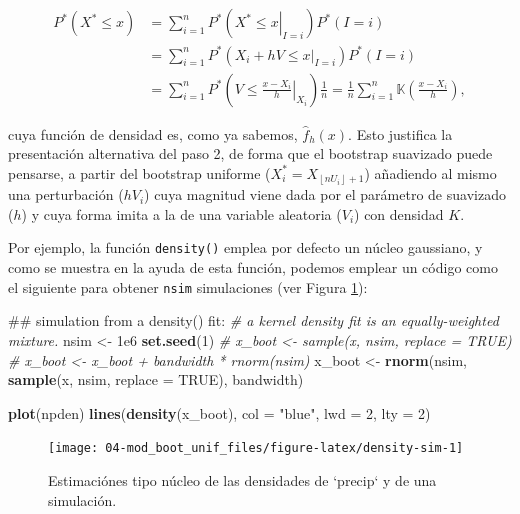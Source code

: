 \documentclass[]{book}
\newenvironment{Shaded}{\begin{snugshade}}{\end{snugshade}}
\newcommand{\KeywordTok}[1]{\textcolor[rgb]{0.13,0.29,0.53}{\textbf{#1}}}
\newcommand{\DataTypeTok}[1]{\textcolor[rgb]{0.13,0.29,0.53}{#1}}
\newcommand{\DecValTok}[1]{\textcolor[rgb]{0.00,0.00,0.81}{#1}}
\newcommand{\FloatTok}[1]{\textcolor[rgb]{0.00,0.00,0.81}{#1}}
\newcommand{\StringTok}[1]{\textcolor[rgb]{0.31,0.60,0.02}{#1}}
\newcommand{\CommentTok}[1]{\textcolor[rgb]{0.56,0.35,0.01}{\textit{#1}}}
\newcommand{\OtherTok}[1]{\textcolor[rgb]{0.56,0.35,0.01}{#1}}
\newcommand{\NormalTok}[1]{#1}
\theoremstyle{definition}
\theoremstyle{definition}
\theoremstyle{definition}
\theoremstyle{remark}
\begin{document}
\[\begin{aligned}
P^{\ast}\left( X^{\ast}\leq x \right) &= \sum_{i=1}^{n}P^{\ast}\left(
\left. X^{\ast}\leq x\right\vert _{I=i} \right) P^{\ast}\left( I=i \right) \\
&= \sum_{i=1}^{n}P^{\ast}\left( \left. X_i+hV\leq x\right\vert
_{I=i} \right) P^{\ast}\left( I=i \right) \\
&= \sum_{i=1}^{n}P^{\ast}\left( \left. V\leq \frac{x-X_i}{h}
\right\vert _{X_i} \right) \frac{1}{n}=\frac{1}{n}\sum_{i=1}^{n}\mathbb{K}
\left( \frac{x-X_i}{h} \right),
\end{aligned}\]

cuya función de densidad es, como ya sabemos,
\(\hat{f}_{h}\left( x \right)\). Esto justifica la presentación
alternativa del paso 2, de forma que el bootstrap suavizado puede
pensarse, a partir del bootstrap uniforme
(\(X_i^{\ast}=X_{\left\lfloor nU_i\right\rfloor +1}\)) añadiendo al
mismo una perturbación (\(hV_i\)) cuya magnitud viene dada por el
parámetro de suavizado (\(h\)) y cuya forma imita a la de una variable
aleatoria (\(V_i\)) con densidad \(K\).

Por ejemplo, la función \texttt{density()} emplea por defecto un núcleo
gaussiano, y como se muestra en la ayuda de esta función, podemos
emplear un código como el siguiente para obtener \texttt{nsim}
simulaciones (ver Figura \ref{fig:density-sim}):

\begin{Shaded}
\begin{Highlighting}[]
\NormalTok{## simulation from a density() fit:}
\CommentTok{# a kernel density fit is an equally-weighted mixture.}
\NormalTok{nsim <-}\StringTok{ }\FloatTok{1e6}
\KeywordTok{set.seed}\NormalTok{(}\DecValTok{1}\NormalTok{)}
\CommentTok{# x_boot <- sample(x, nsim, replace = TRUE)}
\CommentTok{# x_boot <- x_boot + bandwidth * rnorm(nsim)}
\NormalTok{x_boot <-}\StringTok{ }\KeywordTok{rnorm}\NormalTok{(nsim, }\KeywordTok{sample}\NormalTok{(x, nsim, }\DataTypeTok{replace =} \OtherTok{TRUE}\NormalTok{), bandwidth)}

\KeywordTok{plot}\NormalTok{(npden)}
\KeywordTok{lines}\NormalTok{(}\KeywordTok{density}\NormalTok{(x_boot), }\DataTypeTok{col =} \StringTok{"blue"}\NormalTok{, }\DataTypeTok{lwd =} \DecValTok{2}\NormalTok{, }\DataTypeTok{lty =} \DecValTok{2}\NormalTok{)}
\end{Highlighting}
\end{Shaded}

\begin{figure}[!htb]

{\centering \texttt{[image: 04-mod\_boot\_unif\_files/figure-latex/density-sim-1]} 

}

\caption{Estimaciónes tipo núcleo de las densidades de `precip` y de una simulación.}\label{fig:density-sim}
\end{figure}
\end{document}
